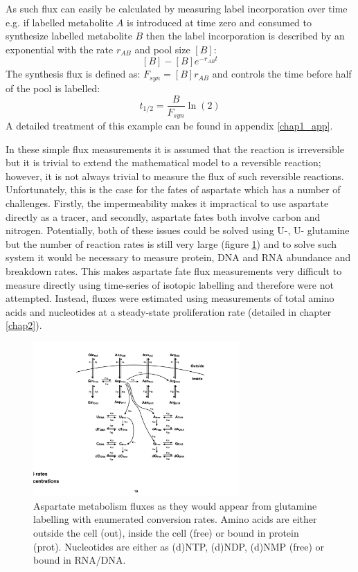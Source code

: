 As such flux can easily be calculated by measuring label incorporation over time e.g. if labelled metabolite $A$ is introduced at time zero and consumed to synthesize labelled metabolite $B$ then the label incorporation is described by an exponential with the rate $r_{AB}$ and pool size $[B]$:
$$
[B] - [B] e^{-r_{AB} t}
$$
The synthesis flux is defined as: $F_{syn} = [B] r_{AB}$ and controls the time before half of the pool is labelled:
$$
t_{1/2} = \frac{B}{F_{syn}} \ln(2)
$$
A detailed treatment of this example can be found in appendix \ref{chap1_app}.

In these simple flux measurements it is assumed that the reaction is irreversible but it is trivial to extend the mathematical model to a reversible reaction; however, it is not always trivial to measure the flux of such reversible reactions.
Unfortunately, this is the case for the fates of aspartate which has a number of challenges.
Firstly, the impermeability makes it impractical to use aspartate directly as a tracer, and secondly, aspartate fates both involve carbon and nitrogen.
Potentially, both of these issues could be solved using U-\hCi{}, U-\hNi{} glutamine but the number of reaction rates is still very large (figure \ref{fig:ch1:asp_fluxes}) and to solve such system it would be necessary to measure protein, DNA and RNA abundance and breakdown rates.
This makes aspartate fate flux measurements very difficult to measure directly using time-series of isotopic labelling and therefore were not attempted.
Instead, fluxes were estimated using measurements of total amino acids and nucleotides at a steady-state proliferation rate (detailed in chapter \ref{chap2}).

\begin{figure}
    \centering
    \includegraphics[width=0.70\textwidth]{figures/chap1/asp_fluxes.pdf}
    \caption[Aspartate metabolism fluxes]{
    Aspartate metabolism fluxes as they would appear from glutamine labelling with enumerated conversion rates.
    Amino acids are either outside the cell (out), inside the cell (free) or bound in protein (prot).
    Nucleotides are either as (d)NTP, (d)NDP, (d)NMP (free) or bound in RNA/DNA.
    }
    \label{fig:ch1:asp_fluxes}
\end{figure}















